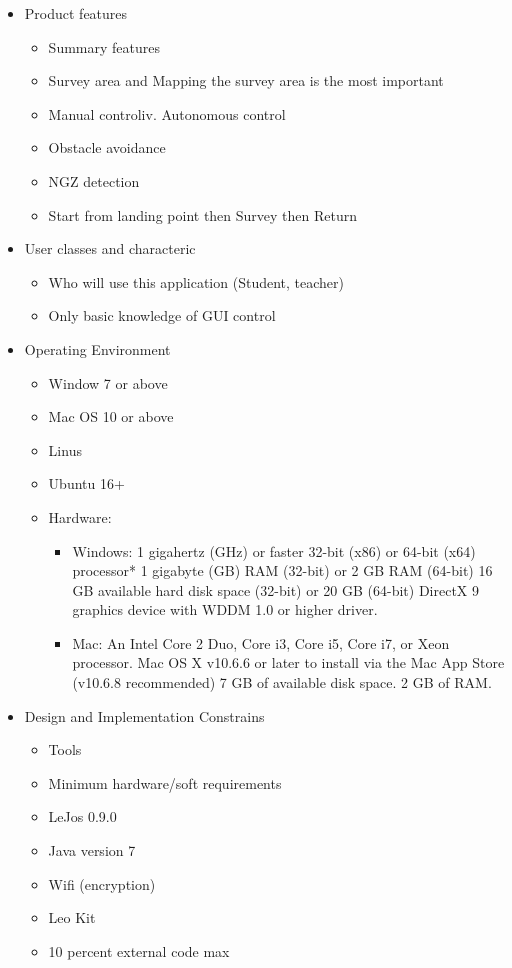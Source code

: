\documentclass[11pt, a4paper]{article}
\begin{document}
\begin{enumerate}
\begin{itemize}
			\item Product features
			\begin{itemize}
				\item Summary features
				\item Survey area and Mapping the survey area is the most important
				\item Manual controliv.	Autonomous control
				\item Obstacle avoidance
				\item NGZ detection
				\item Start from landing point then Survey then Return
			\end{itemize}
		
			\item User classes and characteric
			\begin{itemize}
				\item Who will use this application (Student, teacher)
				\item Only basic knowledge of GUI control
			\end{itemize}
		
			\item Operating Environment 
			\begin{itemize}
				\item Window 7 or above
				\item Mac OS 10 or above
				\item Linus
				\item Ubuntu 16+
				\item Hardware:
				\begin{itemize}
					\item Windows: 1 gigahertz (GHz) or faster 32-bit (x86) or 64-bit (x64) processor*
					1 gigabyte (GB) RAM (32-bit) or 2 GB RAM (64-bit)
					16 GB available hard disk space (32-bit) or 20 GB (64-bit)
					DirectX 9 graphics device with WDDM 1.0 or higher driver.
					\item Mac:
					An Intel Core 2 Duo, Core i3, Core i5, Core i7, or Xeon processor.
					Mac OS X v10.6.6 or later to install via the Mac App Store (v10.6.8 recommended)
					7 GB of available disk space.
					2 GB of RAM.
				\end{itemize}
			\end{itemize}
		
			\item Design and Implementation Constrains
			\begin{itemize}
				\item Tools
				\item Minimum hardware/soft requirements
				\item LeJos 0.9.0
				\item Java version 7
				\item Wifi (encryption)
				\item Leo Kit
				\item 10 percent external code max
			\end{itemize}
		

\end{itemize}
\end{enumerate}
\end{document}
